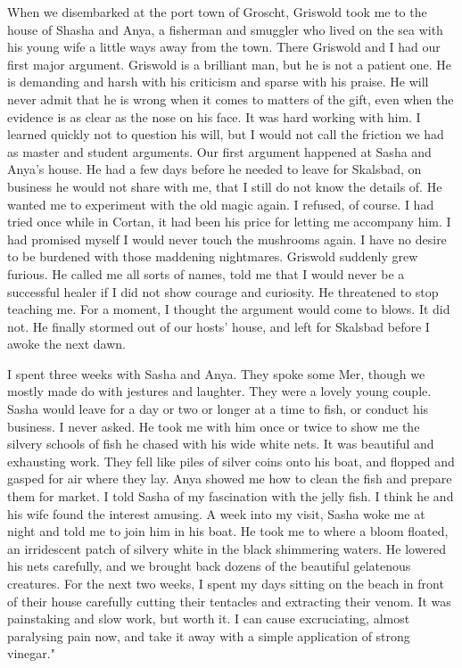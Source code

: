 \documentclass{article}
\begin{document}
When we disembarked at the port town of Groscht, Griswold took me to the house of Shasha and Anya, a fisherman and smuggler who lived on the sea with his young wife a little ways away from the town. There Griswold and I had our first major argument. Griswold is a brilliant man, but he is not a patient one. He is demanding and harsh with his criticism and sparse with his praise. He will never admit that he is wrong when it comes to matters of the gift, even when the evidence is as clear as the nose on his face. It was hard working with him. I learned quickly not to question his will, but I would not call the friction we had as master and student arguments. Our first argument happened at Sasha and Anya's house. He had a few days before he needed to leave for Skalsbad, on business he would not share with me, that I still do not know the details of. He wanted me to experiment with the old magic again. I refused, of course. I had tried once while in Cortan, it had been his price for letting me accompany him. I had promised myself I would never touch the mushrooms again. I have no desire to be burdened with those maddening nightmares. Griswold suddenly grew furious. He called me all sorts of names, told me that I would never be a successful healer if I did not show courage and curiosity. He threatened to stop teaching me. For a moment, I thought the argument would come to blows. It did not. He finally stormed out of our hosts' house, and left for Skalsbad before I awoke the next dawn. 

I spent three weeks with Sasha and Anya. They spoke some Mer, though we mostly made do with jestures and laughter. They were a lovely young couple. Sasha would leave for a day or two or longer at a time to fish, or conduct his business. I never asked. He took me with him once or twice to show me the silvery schools of fish he chased with his wide white nets. It was beautiful and exhausting work. They fell like piles of silver coins onto his boat, and flopped and gasped for air where they lay. Anya showed me how to clean the fish and prepare them for market. I told Sasha of my fascination with the jelly fish. I think he and his wife found the interest amusing. A week into my visit, Sasha woke me at night and told me to join him in his boat. He took me to where a bloom floated, an irridescent patch of silvery white in the black shimmering waters. He lowered his nets carefully, and we brought back dozens of the beautiful gelatenous creatures. For the next two weeks, I spent my days sitting on the beach in front of their house carefully cutting their tentacles and extracting their venom. It was painstaking and slow work, but worth it. I can cause excruciating, almost paralysing pain now, and take it away with a simple application of strong vinegar."
\end{document}
